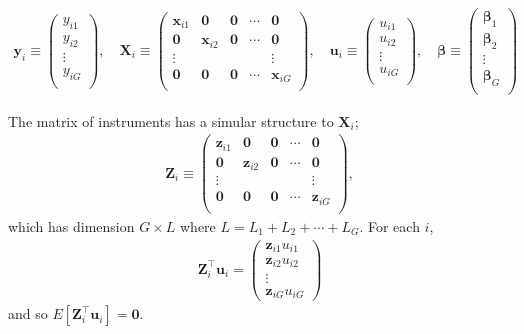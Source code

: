 \documentclass[11pt, a4paper]{article}
\numberwithin{figure}{section}
\theoremstyle{definition}
\newcommand{\0}{\mathbf{0}}
\newcommand{\bmX}{\bm{X}}
\newcommand{\bmZ}{\bm{Z}}
\newcommand{\bmu}{\bm{u}}
\newcommand{\bmx}{\bm{x}}
\newcommand{\bmy}{\bm{y}}
\newcommand{\bmz}{\bm{z}}
\begin{document}
\begin{align*}
    \bmy_i \equiv 
    \begin{pmatrix}
        y_{i1}\\
        y_{i2}\\
        \vdots\\
        y_{iG}\\
    \end{pmatrix},
    \quad \bmX_i\equiv
    \begin{pmatrix}
        \bmx_{i1} & \bm0 & \bm0 & \cdots & \bm0\\
        \bm0 & \bmx_{i2} & \bm0 & \cdots & \bm0\\
        \vdots &  &  &  & \vdots\\
        \bm0 & \bm0 & \bm0 & \cdots & \bmx_{iG}\\
    \end{pmatrix},
    \quad \bmu_i\equiv
    \begin{pmatrix}
        u_{i1}\\
        u_{i2}\\
        \vdots\\
        u_{iG}\\
    \end{pmatrix},
        \quad \bm{\beta}\equiv
    \begin{pmatrix}
        \bm{\beta}_{1}\\
        \bm{\beta}_{2}\\
        \vdots\\
        \bm{\beta}_{G}\\
    \end{pmatrix}
\end{align*}

The matrix of instruments has a simular structure to $\bmX_i$;
\begin{align*}
    \bmZ_i\equiv
    \begin{pmatrix}
        \bmz_{i1} & \bm0 & \bm0 & \cdots & \bm0\\
        \bm0 & \bmz_{i2} & \bm0 & \cdots & \bm0\\
        \vdots &  &  &  & \vdots\\
        \bm0 & \bm0 & \bm0 & \cdots & \bmz_{iG}\\
    \end{pmatrix},
\end{align*}
which has dimension $G\times L$ where $L = L_1 + L_2 + \cdots + L_G$.
For each $i$, 
\begin{align*}
    \bmZ_i^\top \bmu_i =
    \begin{pmatrix}
        \bmz_{i1} u_{i1}\\
        \bmz_{i2} u_{i2}\\
        \vdots\\
        \bmz_{iG} u_{iG}
    \end{pmatrix}
\end{align*}
and so $E[\bmZ_i^\top \bmu_i] = \bm0$.
\end{document}
